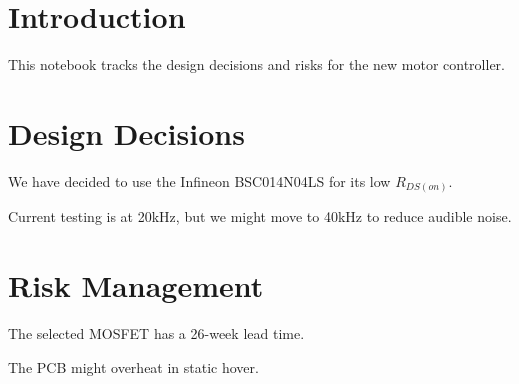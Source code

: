 \documentclass{otengineering}
\begin{document}
\makeotengtitle

\makeprojectstatusreport

\section{Introduction}
This notebook tracks the design decisions and risks for the new motor controller.

\section{Design Decisions}

\begin{decision}
    We have decided to use the Infineon BSC014N04LS for its low $R_{DS(on)}$.
\end{decision}

\begin{decision}
    Current testing is at 20kHz, but we might move to 40kHz to reduce audible noise.
\end{decision}

\section{Risk Management}

\begin{risk}
    The selected MOSFET has a 26-week lead time.
\end{risk}

\begin{risk}
    The PCB might overheat in static hover.
\end{risk}

\newpage

\printprojectdecisionlog

\printprojectriskregister
\end{document}
